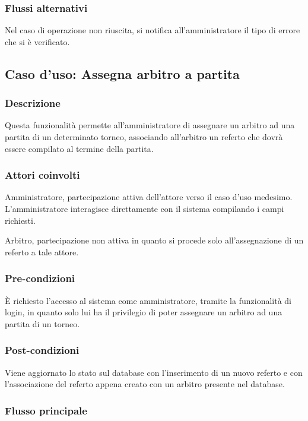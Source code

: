 \subsubsection*{Flussi alternativi}
Nel caso di operazione non riuscita, si notifica all'amministratore il tipo di errore che si è verificato.


%
%
\subsection{Caso d'uso: Assegna arbitro a partita}

\subsubsection*{Descrizione}
Questa funzionalità permette all'amministratore di assegnare un arbitro ad una partita di un determinato torneo, associando all'arbitro un referto che dovrà essere compilato al termine della partita.

\subsubsection*{Attori coinvolti}
Amministratore, partecipazione attiva dell'attore verso il caso d'uso medesimo.
L'amministratore interagisce direttamente con il sistema compilando i campi richiesti.

Arbitro, partecipazione non attiva in quanto si procede solo all'assegnazione di un referto a tale attore.

\subsubsection*{Pre-condizioni}
È richiesto l'accesso al sistema come amministratore, tramite la funzionalità di login, in quanto solo lui ha il privilegio di poter assegnare un arbitro ad una partita di un torneo.

\subsubsection*{Post-condizioni}
Viene aggiornato lo stato sul database con l'inserimento di un nuovo referto e con l'associazione del referto appena creato con un arbitro presente nel database.

\subsubsection*{Flusso principale}

